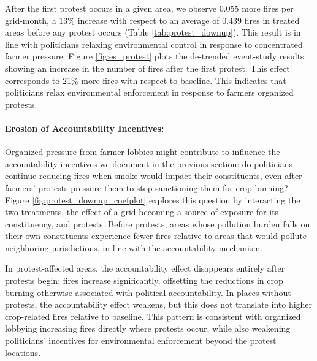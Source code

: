 \documentclass[12pt]{article}
\begin{document}
After the first protest occurs in a given area, we observe 0.055 more fires per grid-month, a 13\% increase with respect to an average of 0.439 fires in treated areas before any protest occurs (Table \ref{tab:protest_downup}). This result is in line with politicians relaxing environmental control in response to concentrated farmer pressure.
Figure \ref{fig:es_protest} plots the de-trended event-study results showing an increase in the number of fires after the first protest. This effect corresponds to 21\% more fires with respect to baseline. This indicates that politicians relax environmental enforcement in response to farmers organized protests. %



\paragraph{Erosion of Accountability Incentives:}
Organized pressure from farmer lobbies might contribute to influence the accountability incentives we document in the previous section: do politicians continue reducing fires when smoke would impact their constituents, even after farmers' protests pressure them to stop sanctioning them for crop burning? Figure \ref{fig:protest_downup_coefplot} explores this question by interacting the two treatments, the effect of a grid becoming a source of exposure for its constituency, and protests. Before protests, areas whose pollution burden falls on their own constituents experience fewer fires relative to areas that would pollute neighboring jurisdictions, in line with the accountability mechanism. 

In protest-affected areas,  the accountability effect disappears entirely after protests begin: fires increase significantly, offsetting the reductions in crop burning otherwise associated with political accountability. In places without protests, the accountability effect weakens, but this does not translate into higher crop-related fires relative to baseline. This pattern is consistent with organized lobbying increasing fires directly where protests occur, while also weakening politicians’ incentives for environmental enforcement beyond the protest locations.
\end{document}
